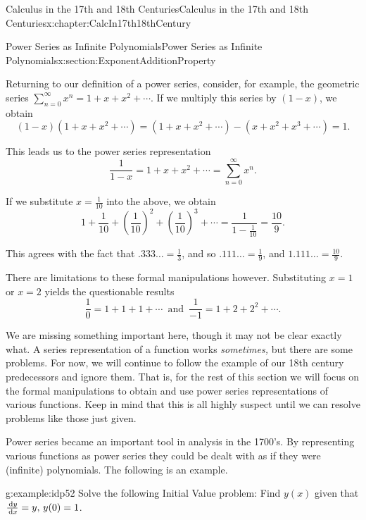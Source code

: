\begin{chapterptx}{Calculus in the 17th and 18th Centuries}{}{Calculus in the 17th and 18th Centuries}{}{}{x:chapter:CalcIn17th18thCentury}
\begin{sectionptx}{Power Series as Infinite Polynomials}{}{Power Series as Infinite Polynomials}{}{}{x:section:ExponentAdditionProperty}
		\par
		Returning to our definition of a power series, consider, for example, the  geometric series \(\sum_{n=0}^\infty x^n=1+x+x^2+\cdots\). If we multiply this series by \((1-x)\), we obtain%
		\begin{equation*}
			(1-x)(1+x+x^2+\cdots)=(1+x+x^2+\cdots)-(x+x^2+x^3+\cdots)=1\text{.}
		\end{equation*}
		\par
		This leads us to the power series representation%
		\begin{equation*}
			\frac{1}{1-x}=1+x+x^2+\cdots=\sum_{n=0}^\infty x^n\text{.}
		\end{equation*}
		\par
		If we substitute \(x=\frac{1}{10}\) into the above, we obtain%
		\begin{equation*}
			1+\frac{1}{10}+\left(\frac{1}{10}\right)^2+\left(\frac{1}{10}\right)^3+ \cdots=\frac{1}{1-\frac{1}{10}}=\frac{10}{9}\text{.}
		\end{equation*}
		\par
		This agrees with the fact that \(.333\ldots=\frac{1}{3}\), and so \(.111\ldots=\frac{1}{9}\), and \(1.111\ldots=\frac{10}{9}\).%
		\par
		There are limitations to these formal manipulations however. Substituting \(x=1\) or \(x=2\) yields the questionable results%
		\begin{equation*}
			\frac{1}{0}=1+1+1+\cdots\,\text{  and  }  \,\frac{1}{-1}=1+2+2^2+\cdots\text{.}
		\end{equation*}
		\par
		We are missing something important here, though it may not be clear exactly what. A series representation of a function works \emph{sometimes,} but there are some problems. For now, we will continue to follow the example of our 18th century predecessors and ignore them. That is, for the rest of this section we will focus on the formal manipulations to obtain and use power series representations of various functions. Keep in mind that this is all highly suspect until we can resolve problems like those just given.%
		\par
		Power series became an important tool in analysis in the 1700's.  By representing various functions as power series they could be dealt with as if they were (infinite) polynomials.  The following is an example.%
		\begin{example}{}{g:example:idp52}%
			Solve the following Initial Value problem: Find \(y(x)\) given that \(\frac{\,{\rm d} y}{\,{\rm d} x}=y,\,y(0)=1\).%

\end{example}
\end{sectionptx}
\end{chapterptx}
